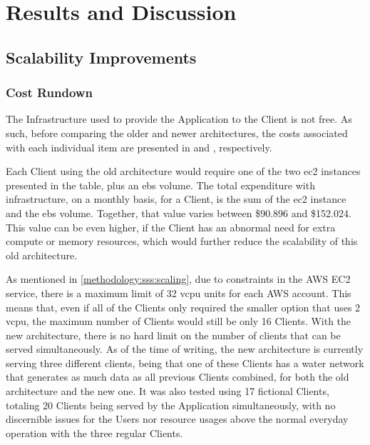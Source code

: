 \chapter{Results and Discussion}\label{results-and-discussion}

\section{Scalability Improvements}\label{results-and-discussion:s:scalability-improvements}

\subsection{Cost Rundown}\label{results-and-discussion:ss:cost-rundown}

The Infrastructure used to provide the Application to the Client is not free. As such, before comparing the older and newer architectures, the costs associated with each individual item are presented in  and , respectively.



Each Client using the old architecture would require one of the two \gls{ec2} instances presented in the  table, plus an \gls{ebs} volume. The total expenditure with infrastructure, on a monthly basis, for a Client, is the sum of the \gls{ec2} instance and the \gls{ebs} volume. Together, that value varies between \$90.896 and \$152.024. This value can be even higher, if the Client has an abnormal need for extra compute or memory resources, which would further reduce the scalability of this old architecture.





As mentioned in \cref{methodology:sss:scaling}, due to constraints in the AWS EC2 service, there is a maximum limit of 32 \gls{vcpu} units for each AWS account. This means that, even if all of the Clients only required the smaller option that uses 2 \gls{vcpu}, the maximum number of Clients would still be only 16 Clients. With the new architecture, there is no hard limit on the number of clients that can be served simultaneously. As of the time of writing, the new architecture is currently serving three different clients, being that one of these Clients has a water network that generates as much data as all previous Clients combined, for both the old architecture and the new one. It was also tested using 17 fictional Clients, totaling 20 Clients being served by the Application simultaneously, with no discernible issues for the Users nor resource usages above the normal everyday operation with the three regular Clients.

